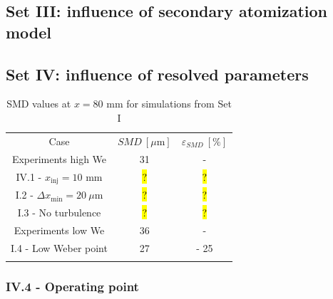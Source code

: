 \subsection{Set III: influence of secondary atomization model}

\subsection{Set IV: influence of resolved parameters}

\begin{table}[!h]
\centering
\caption{SMD values at $x = 80$ mm for simulations from Set I}
\begin{tabular}{ccc}
\thickhline
Case & $SMD~\left[\mu \mathrm{m} \right]$ & $\varepsilon_{SMD}~\left[\% \right]$ \\
\thickhline
Experiments high We & 31 & - \\
IV.1 - $x_\mathrm{inj} = 10$ mm & \hl{?} & \hl{?} \\
I.2 - $\Delta x_\mathrm{min} = 20~\mu$m & \hl{?} & \hl{?} \\
I.3 - No turbulence & \hl{?} & \hl{?} \\
\hline 
Experiments low We & 36 & - \\
I.4 - Low Weber point & 27 & - 25 \\
\thickhline
\end{tabular}
\label{tab:jicf_tools_trajectories_obtention}
\end{table}

\subsubsection{IV.4 - Operating point}

